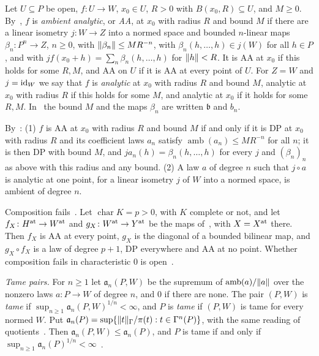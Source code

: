 Let $U\subseteq P$ be open, $f\colon U\to W$, $x_0\in U$, $R>0$ with $B(x_0,R)\subseteq U$, and $M\ge0$. By~\cite[Definition~14.7]{I}, $f$ is \emph{ambient analytic}, or \emph{AA}, at $x_0$ with radius $R$ and bound $M$ if there are a linear isometry $j\colon W\to Z$ into a normed space and bounded $n$-linear maps $\beta_n\colon P^n\to Z$, $n\ge0$, with $\lVert \beta_n\rVert\le MR^{-n}$, with $\beta_n(h,\dots,h)\in j(W)$ for all $h\in P$, and with $jf(x_0+h)=\sum_n\beta_n(h,\dots,h)$ for $\lVert h\rVert<R$. It is AA at $x_0$ if this holds for some $R,M$, and AA on $U$ if it is AA at every point of $U$. For $Z=W$ and $j=\mathrm{id}_W$ we say that $f$ is \emph{analytic} at $x_0$ with radius $R$ and bound $M$, analytic at $x_0$ with radius $R$ if this holds for some $M$, and analytic at $x_0$ if it holds for some $R,M$. In~\cite{I} the bound $M$ and the maps $\beta_n$ are written $\mathfrak b$ and $b_n$.

By~\cite[Proposition~14.9]{I}: (1) $f$ is AA at $x_0$ with radius $R$ and bound $M$ if and only if it is DP at $x_0$ with radius $R$ and its coefficient laws $a_n$ satisfy $\operatorname{amb}(a_n)\le MR^{-n}$ for all $n$; it is then DP with bound $M$, and $ja_n(h)=\beta_n(h,\dots,h)$ for every $j$ and $(\beta_n)_n$ as above with this radius and any bound. (2) A law $a$ of degree $n$ such that $j\circ a$ is analytic at one point, for a linear isometry $j$ of $W$ into a normed space, is ambient of degree $n$.

Composition fails~\cite[Theorem~14.17]{I}. Let $\operatorname{char}K=p>0$, with $K$ complete or not, and let $f_X\colon H^{\rm at}\to W^{\rm at}$ and $g_X\colon W^{\rm at}\to Y^{\rm at}$ be the maps of~\cite[Definition~14.16]{I}, with $X=X^{\rm at}$ there. Then $f_X$ is AA at every point, $g_X$ is the diagonal of a bounded bilinear map, and $g_X\circ f_X$ is a law of degree $p+1$, DP everywhere and AA at no point. Whether composition fails in characteristic $0$ is open~\cite[Remark~14.20]{I}.

\emph{Tame pairs.} For $n\ge1$ let $\mathfrak a_n(P,W)$ be the supremum of $\operatorname{amb}(a)/\lVert a\rVert$ over the nonzero laws $a\colon P\to W$ of degree $n$, and $0$ if there are none. The pair $(P,W)$ is \emph{tame} if $\sup_{n\ge1}\mathfrak a_n(P,W)^{1/n}<\infty$, and $P$ is \emph{tame} if $(P,W)$ is tame for every normed $W$. Put $\mathfrak a_n(P)=\sup\{\lVert t\rVert_\Gamma/\pi(t):t\in\Gamma^n(P)\}$, with the same reading of quotients~\cite[Definition~14.36]{I}. Then $\mathfrak a_n(P,W)\le\mathfrak a_n(P)$, and $P$ is tame if and only if $\sup_{n\ge1}\mathfrak a_n(P)^{1/n}<\infty$~\cite[text after Definition~14.36]{I}.

